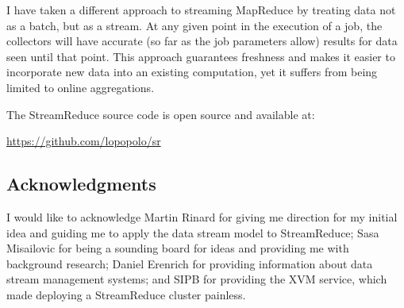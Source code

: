 \documentclass[12pt,twocolumn]{article}
\begin{document}
I have taken a different approach to streaming MapReduce by treating data not as a batch, but
as a stream. At any given point in the execution of a job, the collectors will have accurate
(so far as the job parameters allow) results for data seen until that point. This approach
guarantees freshness and makes it easier to incorporate new data into an existing computation,
yet it suffers from being limited to online aggregations.

The StreamReduce source code is open source and available at:
\begin{center}
  \url{https://github.com/lopopolo/sr}
\end{center}

\subsection*{Acknowledgments}
I would like to acknowledge Martin Rinard for giving me direction for my initial idea
and guiding me to apply the data stream model to StreamReduce; Sasa Misailovic for being
a sounding board for ideas and providing me with background research; Daniel Erenrich for
providing information about data stream management systems; and SIPB for providing the
XVM service, which made deploying a StreamReduce cluster painless.

{}

\end{document}
